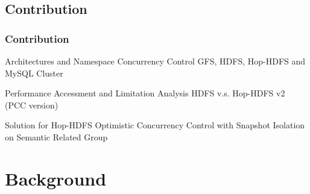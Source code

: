 \documentclass{beamer}
\begin{document}
\subsection{Contribution}
\begin{frame}
\frametitle{Contribution}
\begin{block}{Architectures and Namespace Concurrency Control}
GFS, HDFS, Hop-HDFS and MySQL Cluster
\end{block}

\begin{block}{Performance Accessment and Limitation Analysis}
HDFS v.s. Hop-HDFS v2 (PCC version)
\end{block}

\begin{block}{Solution for Hop-HDFS}
Optimistic Concurrency Control with Snapshot Isolation on Semantic Related Group
\end{block}
\end{frame}

\section{Background}
\end{document}

